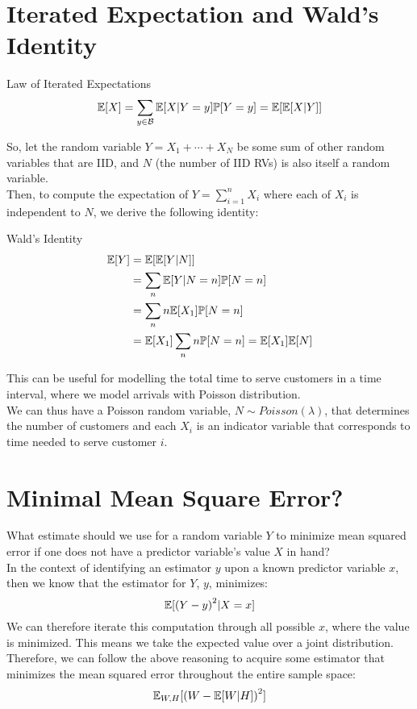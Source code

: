 \section{Iterated Expectation and Wald's Identity}
\begin{ln-theorem}{Law of Iterated Expectations}{}
    \[
        \mathbb{E}[X] = \sum_{y \in \mathcal{B}} \mathbb{E}[X | Y = y] \mathbb{P}[Y = y] = \mathbb{E}[\mathbb{E}[X | Y]]
    \]
\end{ln-theorem}

So, let the random variable $Y = X_1 + \cdots + X_N$ be some sum of other random variables that are IID, and $N$ (the number of IID RVs) is also itself a random variable. \\
Then, to compute the expectation of $Y = \sum_{i = 1}^n X_i$ where each of $X_i$ is independent to $N$, we derive the following identity:
\begin{ln-theorem}{Wald's Identity}{}
    \begin{align*}
        \mathbb{E}[Y] &= \mathbb{E}[\mathbb{E}[Y | N]] \\
        &= \sum_n \mathbb{E}[Y | N = n] \mathbb{P}[N = n] \\
        &= \sum_n n \mathbb{E}[X_1] \mathbb{P}[N = n] \\
        &= \mathbb{E}[X_1] \sum_n n\mathbb{P}[N = n] = \mathbb{E}[X_1] \mathbb{E}[N]
    \end{align*}
\end{ln-theorem}

This can be useful for modelling the total time to serve customers in a time interval, where we model arrivals with Poisson distribution. \\
We can thus have a Poisson random variable, $N \sim Poisson(\lambda)$, that determines the number of customers and each $X_i$ is an indicator variable that corresponds to time needed to serve customer $i$.

\section{Minimal Mean Square Error?}
What estimate should we use for a random variable $Y$ to minimize mean squared error if one does not have a predictor variable's value $X$ in hand? \\
In the context of identifying an estimator $y$ upon a known predictor variable $x$, then we know that the estimator for $Y$, $y$, minimizes:
\[\mathbb{E}[{(Y - y)}^2 | X = x]\]
We can therefore iterate this computation through all possible $x$, where the value is minimized. This means we take the expected value over a joint distribution. \\
Therefore, we can follow the above reasoning to acquire some estimator that minimizes the mean squared error throughout the entire sample space:
\[
    \mathbb{E}_{W, H}[{(W - \mathbb{E}[W | H])}^2]
\]

